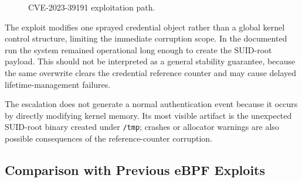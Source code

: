 \documentclass[../main.tex]{subfiles}
\begin{document}
\begin{figure}[H]
\centering
{}
\caption{CVE-2023-39191 exploitation path.}
\end{figure}

The exploit modifies one sprayed credential object rather than a global kernel control structure, limiting the immediate corruption scope. In the documented run the system remained operational long enough to create the SUID-root payload. This should not be interpreted as a general stability guarantee, because the same overwrite clears the credential reference counter and may cause delayed lifetime-management failures.

The escalation does not generate a normal authentication event because it occurs by directly modifying kernel memory. Its most visible artifact is the unexpected SUID-root binary created under \texttt{/tmp}; crashes or allocator warnings are also possible consequences of the reference-counter corruption.

\subsection{Comparison with Previous eBPF Exploits}
\end{document}
